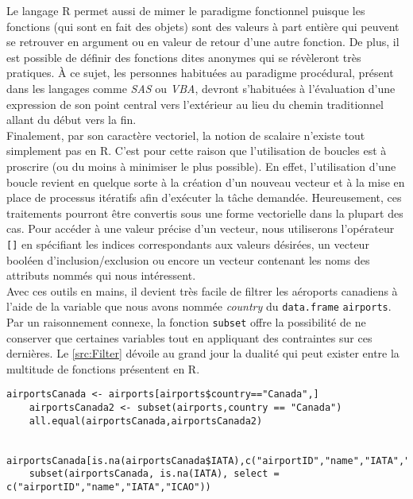 Le langage R permet aussi de mimer le paradigme fonctionnel puisque les fonctions (qui sont en fait des objets) sont des valeurs à part entière qui peuvent se retrouver en argument ou en valeur de retour d'une autre fonction. De plus, il est possible de définir des fonctions dites anonymes qui se révèleront très pratiques. À ce sujet, les personnes habituées au paradigme procédural, présent dans les langages comme \emph{SAS} ou \emph{VBA}, devront s'habituées à l'évaluation d'une expression de son point central vers l'extérieur au lieu du chemin traditionnel allant du début vers la fin. \\

Finalement, par son caractère vectoriel, la notion de scalaire n'existe tout simplement pas en R. C'est pour cette raison que l'utilisation de boucles est à proscrire (ou du moins à minimiser le plus possible). En effet, l'utilisation d'une boucle revient en quelque sorte à la création d'un nouveau vecteur et à la mise en place de processus itératifs afin d'exécuter la tâche demandée. Heureusement, ces traitements pourront être convertis sous une forme vectorielle dans la plupart des cas. \cite{Goulet} Pour accéder à une valeur précise d'un vecteur, nous utiliserons l'opérateur \texttt{[]} en spécifiant les indices correspondants aux valeurs désirées, un vecteur booléen d'inclusion/exclusion ou encore un vecteur contenant les noms des attributs nommés qui nous intéressent. \\

Avec ces outils en mains, il devient très facile de filtrer les aéroports canadiens à l'aide de la variable que nous avons nommée \emph{country} du \texttt{data.frame} \texttt{airports}. Par un raisonnement connexe, la fonction \texttt{subset} \cite{Rfunction:subset} offre la possibilité de ne conserver que certaines variables tout en appliquant des contraintes sur ces dernières. Le \autoref{src:Filter} dévoile au grand jour la dualité qui peut exister entre la multitude de fonctions présentent en R. \\

\begin{lstlisting}[caption = Filtrer les données,label=src:Filter]
	airportsCanada <- airports[airports$country=="Canada",]
	airportsCanada2 <- subset(airports,country == "Canada")
	all.equal(airportsCanada,airportsCanada2)

	airportsCanada[is.na(airportsCanada$IATA),c("airportID","name","IATA","ICAO")]
	subset(airportsCanada, is.na(IATA), select = c("airportID","name","IATA","ICAO"))
\end{lstlisting}

